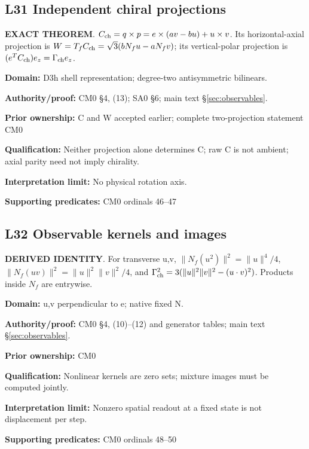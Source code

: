 \par\noindent\begin{minipage}{\linewidth}
\subsection*{L31 Independent chiral projections}
\textbf{EXACT THEOREM}. \(C_{\rm ch}=q\times p=e\times(av-bu)+u\times v\). Its horizontal-axial projection is \(W=T_fC_{\rm ch}=\sqrt3(bN_fu-aN_fv)\); its vertical-polar projection is \((e^TC_{\rm ch})e_z=\Gamma_{\rm ch}e_z\).\par
\textbf{Domain:} D3h shell representation; degree-two antisymmetric bilinears.\par
\textbf{Authority/proof:} CM0 \S{}4, (13); SA0 \S{}6; main text \S\ref{sec:observables}.\par
\textbf{Prior ownership:} C and W accepted earlier; complete two-projection statement CM0\par
\textbf{Qualification:} Neither projection alone determines C; raw C is not ambient; axial parity need not imply chirality.\par
\textbf{Interpretation limit:} No physical rotation axis.\par
\textbf{Supporting predicates:} CM0 ordinals 46--47\par
\end{minipage}\par\medskip
\par\noindent\begin{minipage}{\linewidth}
\subsection*{L32 Observable kernels and images}
\textbf{DERIVED IDENTITY}. For transverse u,v, \(\|N_f(u^2)\|^2=\|u\|^4/4\), \(\|N_f(uv)\|^2=\|u\|^2\|v\|^2/4\), and \(\Gamma_{\rm ch}^2=3(\|u\|^2\|v\|^2-(u\cdot v)^2)\). Products inside \(N_f\) are entrywise.\par
\textbf{Domain:} u,v perpendicular to e; native fixed N.\par
\textbf{Authority/proof:} CM0 \S{}4, (10)--(12) and generator tables; main text \S\ref{sec:observables}.\par
\textbf{Prior ownership:} CM0\par
\textbf{Qualification:} Nonlinear kernels are zero sets; mixture images must be computed jointly.\par
\textbf{Interpretation limit:} Nonzero spatial readout at a fixed state is not displacement per step.\par
\textbf{Supporting predicates:} CM0 ordinals 48--50\par
\end{minipage}\par\medskip
